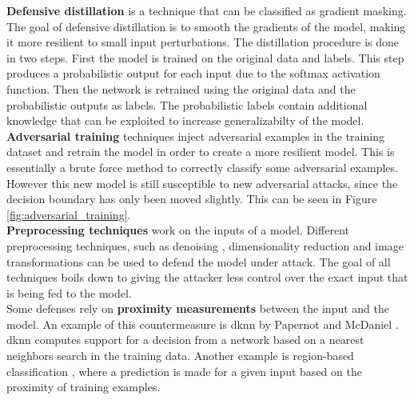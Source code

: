 \textbf{Defensive distillation}  \cite{defensive_distillation} is a technique that can be classified as gradient masking. The goal of defensive distillation is to smooth the gradients of the model, making it more resilient to small input perturbations. The distillation procedure is done in two steps. First the model is trained on the original data and labels. This step produces a probabilistic output for each input due to the softmax activation function. Then the network is retrained using the original data and the probabilistic outputs as labels. The probabilistic labels contain additional knowledge that can be exploited to increase generalizabilty of the model.\\

\textbf{Adversarial training} \cite{FGSM} techniques inject adversarial examples in the training dataset and retrain the model in order to create a more resilient model. This is essentially a brute force method to correctly classify some adversarial examples. However this new model is still susceptible to new adversarial attacks, since the decision boundary has only been moved slightly. This can be seen in Figure \ref{fig:adversarial_training}.\\

\textbf{Preprocessing techniques} work on the inputs of a model. Different preprocessing techniques, such as denoising \cite{denoising}, dimensionality reduction \cite{dimensionality_reduction} and image transformations \cite{image_transformations} can be used to defend the model under attack. The goal of all techniques boils down to giving the attacker less control over the exact input that is being fed to the model.\\

Some defenses rely on \textbf{proximity measurements} between the input and the model. An example of this countermeasure is \gls{dknn} by Papernot and McDaniel \cite{dknn}. \gls{dknn} computes support for a decision from a network based on a nearest neighbors search in the training data. Another example is region-based classification \cite{region-based_classification}, where a prediction is made for a given input based on the proximity of training examples.\\ 

